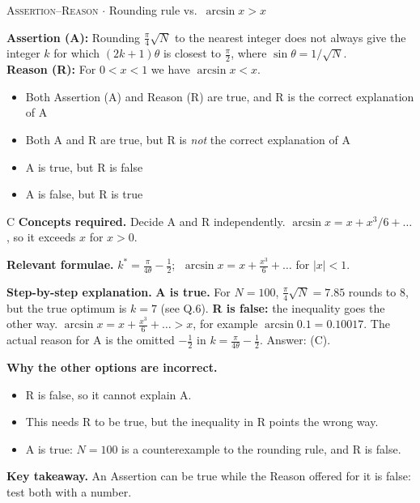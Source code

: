 \documentclass[11pt,a4paper]{article}
\newcommand{\optlabel}[1]{\textbf{(#1)}}
\newcommand{\correctlabel}[1]{\textcolor{okgreen}{\textbf{(#1)}\,\ding{51}}}
\newenvironment{qitem}[1]{\begin{list}{}{\setlength{\leftmargin}{3.3em}\setlength{\labelwidth}{3.1em}%
  \setlength{\labelsep}{0.2em}\setlength{\topsep}{3pt}\setlength{\parsep}{3pt}}\item[\textbf{Q.#1}\hfill]}{\end{list}}
\newcommand{\qsep}{\par\vspace{2pt}{\color{black!15}\hrule}\vspace{4pt}}
\newcommand{\qmeta}[2]{{\footnotesize\color{black!60}\textsc{#1} \;$\cdot$\; #2}\par}
\begin{document}
\qsep

\begin{qitem}{17}
\qmeta{Assertion--Reason}{Rounding rule vs.\ $\arcsin x > x$}
\textbf{Assertion (A):} Rounding $\frac\pi4\sqrt N$ to the nearest integer does not always give the integer $k$ for which
$(2k+1)\theta$ is closest to $\frac\pi2$, where $\sin\theta = 1/\sqrt N$.\\[1mm]
\textbf{Reason (R):} For $0 < x < 1$ we have $\arcsin x < x$.
\begin{itemize}[leftmargin=2.6em, labelsep=0.4em, itemsep=2pt, topsep=3pt]
\item[\optlabel{A}] Both Assertion (A) and Reason (R) are true, and R is the correct explanation of A
\item[\optlabel{B}] Both A and R are true, but R is \emph{not} the correct explanation of A
\item[\correctlabel{C}] A is true, but R is false
\item[\optlabel{D}] A is false, but R is true
\end{itemize}
\end{qitem}
\begin{solbox}{C}
\textbf{\color{brand}Concepts required.} Decide A and R independently. $\arcsin x = x + x^3/6 + \dots$, so it exceeds $x$ for $x > 0$.

\textbf{\color{brand}Relevant formulae.} $k^\ast = \frac{\pi}{4\theta} - \frac12$; $\;\arcsin x = x + \frac{x^3}{6} + \dots$ for $|x| < 1$.

\textbf{\color{brand}Step-by-step explanation.} \textbf{A is true.} For $N = 100$, $\frac\pi4\sqrt N = 7.85$ rounds to $8$, but the true optimum is $k = 7$ (see Q.6).
\textbf{R is false:} the inequality goes the other way. $\arcsin x = x + \frac{x^3}{6} + \dots > x$, for example $\arcsin 0.1 = 0.10017$.
The actual reason for A is the omitted $-\frac12$ in $k = \frac{\pi}{4\theta} - \frac12$. Answer: (C).

\textbf{\color{brand}Why the other options are incorrect.}
\begin{itemize}[leftmargin=2.4em, itemsep=1pt, topsep=2pt]
\item[\textbf{(A)}] R is false, so it cannot explain A.
\item[\textbf{(B)}] This needs R to be true, but the inequality in R points the wrong way.
\item[\textbf{(D)}] A is true: $N = 100$ is a counterexample to the rounding rule, and R is false.
\end{itemize}
\textbf{\color{brand}Key takeaway.} An Assertion can be true while the Reason offered for it is false: test both with a number.
\end{solbox}
\qsep
\end{document}
